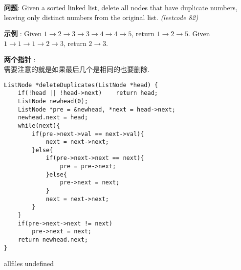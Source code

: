 \documentclass{article}
\begin{document}
\begin{CJK}{UTF8}{gbsn}     %

\else
    
\begin{description}
    \item{\textbf{问题}}: Given a sorted linked list, delete all nodes that have duplicate numbers, leaving only distinct numbers from the original list. \textit{(leetcode 82)}
    \item{\textbf{示例}} : Given $1\rightarrow2\rightarrow3\rightarrow3\rightarrow4\rightarrow4\rightarrow5$, return $1\rightarrow2\rightarrow5$. Given $1\rightarrow1\rightarrow1\rightarrow2\rightarrow3$, return $2\rightarrow3$.
    \item{\textbf{两个指针}} : 
    \\需要注意的就是如果最后几个是相同的也要删除.
    \begin{lstlisting}
ListNode *deleteDuplicates(ListNode *head) {
	if(!head || !head->next)	return head;
	ListNode newhead(0);
	ListNode *pre = &newhead, *next = head->next;
	newhead.next = head;
	while(next){
		if(pre->next->val == next->val){
			next = next->next;
		}else{
			if(pre->next->next == next){
				pre = pre->next;
			}else{
				pre->next = next;
			}
			next = next->next;
		}
	}
	if(pre->next->next != next)
		pre->next = next;
	return newhead.next;
}
    \end{lstlisting}
    \textit{}
\end{description}

\fi

\ifx allfiles undefined
\end{CJK}
\end{document}
